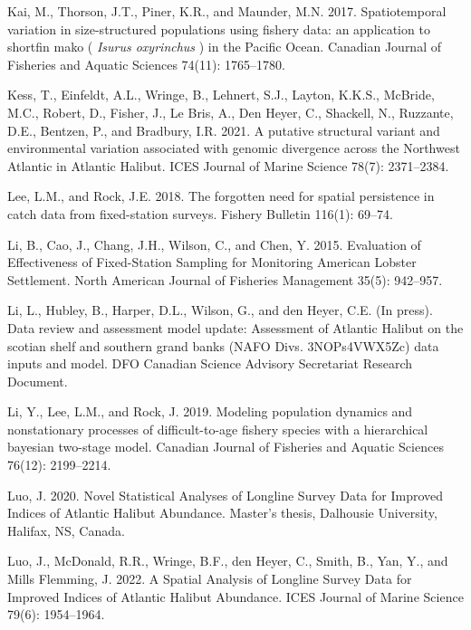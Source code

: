 \documentclass[12pt]{article}\usepackage[]{graphicx}\usepackage[]{color}
\begin{document}
\leavevmode\hypertarget{ref-Kai2017}{}%
Kai, M., Thorson, J.T., Piner, K.R., and Maunder, M.N. 2017. Spatiotemporal variation in size-structured populations using fishery data: an application to shortfin mako ( \emph{Isurus oxyrinchus} ) in the Pacific Ocean. Canadian Journal of Fisheries and Aquatic Sciences 74(11): 1765--1780.

\leavevmode\hypertarget{ref-Kess2021}{}%
Kess, T., Einfeldt, A.L., Wringe, B., Lehnert, S.J., Layton, K.K.S., McBride, M.C., Robert, D., Fisher, J., Le Bris, A., Den Heyer, C., Shackell, N., Ruzzante, D.E., Bentzen, P., and Bradbury, I.R. 2021. A putative structural variant and environmental variation associated with genomic divergence across the Northwest Atlantic in Atlantic Halibut. ICES Journal of Marine Science 78(7): 2371--2384.

\leavevmode\hypertarget{ref-Lee2018}{}%
Lee, L.M., and Rock, J.E. 2018. The forgotten need for spatial persistence in catch data from fixed-station surveys. Fishery Bulletin 116(1): 69--74.

\leavevmode\hypertarget{ref-Li2015}{}%
Li, B., Cao, J., Chang, J.H., Wilson, C., and Chen, Y. 2015. Evaluation of Effectiveness of Fixed-Station Sampling for Monitoring American Lobster Settlement. North American Journal of Fisheries Management 35(5): 942--957.

\leavevmode\hypertarget{ref-Li2022}{}%
Li, L., Hubley, B., Harper, D.L., Wilson, G., and den Heyer, C.E. (In press). Data review and assessment model update: Assessment of Atlantic Halibut on the scotian shelf and southern grand banks (NAFO Divs. 3NOPs4VWX5Zc) data inputs and model. DFO Canadian Science Advisory Secretariat Research Document.

\leavevmode\hypertarget{ref-Li2019}{}%
Li, Y., Lee, L.M., and Rock, J. 2019. Modeling population dynamics and nonstationary processes of difficult-to-age fishery species with a hierarchical bayesian two-stage model. Canadian Journal of Fisheries and Aquatic Sciences 76(12): 2199--2214.

\leavevmode\hypertarget{ref-Luo2020}{}%
Luo, J. 2020. Novel Statistical Analyses of Longline Survey Data for Improved Indices of Atlantic Halibut Abundance. Master's thesis, Dalhousie University, Halifax, NS, Canada.

\leavevmode\hypertarget{ref-Luo2022}{}%
Luo, J., McDonald, R.R., Wringe, B.F., den Heyer, C., Smith, B., Yan, Y., and Mills Flemming, J. 2022. A Spatial Analysis of Longline Survey Data for Improved Indices of Atlantic Halibut Abundance. ICES Journal of Marine Science 79(6): 1954--1964.
\end{document}

